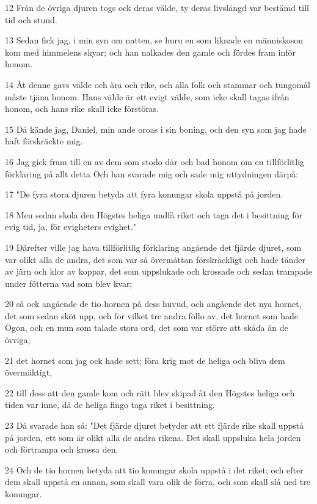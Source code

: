\par 12 Från de övriga djuren togs ock deras välde, ty deras livslängd var bestämd till tid och stund.
\par 13 Sedan fick jag, i min syn om natten, se huru en som liknade en människoson kom med himmelens skyar; och han nalkades den gamle och fördes fram inför honom.
\par 14 Åt denne gavs välde och ära och rike, och alla folk och stammar och tungomål måste tjäna honom. Hans välde är ett evigt välde, som icke skall tagas ifrån honom, och hans rike skall icke förstöras.
\par 15 Då kände jag, Daniel, min ande oroas i sin boning, och den syn som jag hade haft förskräckte mig.
\par 16 Jag gick fram till en av dem som stodo där och bad honom om en tillförlitlig förklaring på allt detta Och han svarade mig och sade mig uttydningen därpå:
\par 17 "De fyra stora djuren betyda att fyra konungar skola uppstå på jorden.
\par 18 Men sedan skola den Högstes heliga undfå riket och taga det i besittning för evig tid, ja, för evigheters evighet."
\par 19 Därefter ville jag hava tillförlitlig förklaring angående det fjärde djuret, som var olikt alla de andra, det som var så övermåttan förskräckligt och hade tänder av järn och klor av koppar, det som uppslukade och krossade och sedan trampade under fötterna vad som blev kvar;
\par 20 så ock angående de tio hornen på dess huvud, och angående det nya hornet, det som sedan sköt upp, och för vilket tre andra föllo av, det hornet som hade Ögon, och en mun som talade stora ord, det som var större att skåda än de övriga,
\par 21 det hornet som jag ock hade sett; föra krig mot de heliga och bliva dem övermäktigt,
\par 22 till dess att den gamle kom och rätt blev skipad åt den Högstes heliga och tiden var inne, då de heliga fingo taga riket i besittning.
\par 23 Då svarade han så: "Det fjärde djuret betyder att ett fjärde rike skall uppstå på jorden, ett som är olikt alla de andra rikena. Det skall uppsluka hela jorden och förtrampa och krossa den.
\par 24 Och de tio hornen betyda att tio konungar skola uppstå i det riket; och efter dem skall uppstå en annan, som skall vara olik de förra, och som skall slå ned tre konungar.
